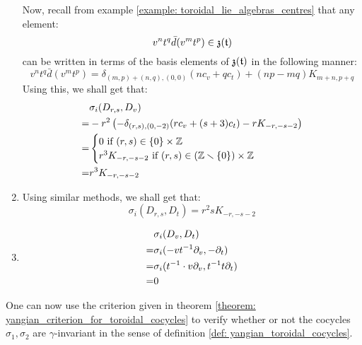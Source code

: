 \begin{example}
\begin{enumerate}
$$                    $$
                Now, recall from example \ref{example: toroidal_lie_algebras_centres} that any element:
                    $$v^n t^q \bar{d}(v^m t^p) \in \mathfrak{z}(\mathfrak{t})$$
                can be written in terms of the basis elements of $\mathfrak{z}(\mathfrak{t})$ in the following manner:
                    $$v^n t^q \bar{d}(v^m t^p) = \delta_{(m, p) + (n, q), (0, 0)} ( n c_v + q c_t ) + (np - mq) K_{m + n, p + q}$$
                Using this, we shall get that:
                    $$
                        \begin{aligned}
                            & \sigma_i(D_{r, s}, D_v)
                            \\
                            = & -r^2 \left( -\delta_{(r, s), (0, -2)} ( r c_v + (s + 3) c_t ) - r K_{-r, -s - 2} \right)
                            \\
                            = &
                            \begin{cases}
                                \text{$0$ if $(r, s) \in \{0\} \x \Z$}
                                \\
                                \text{$r^3 K_{-r, -s - 2}$ if $(r, s) \in (\Z \setminus \{0\}) \x \Z$}
                            \end{cases}
                            \\
                            = & r^3 K_{-r, -s - 2}
                        \end{aligned}
                    $$
                \item Using similar methods, we shall get that:
                    $$\sigma_i(D_{r, s}, D_t) = r^2s K_{-r, -s - 2}$$
                \item
                    $$
                        \begin{aligned}
                            & \sigma_i(D_v, D_t)
                            \\
                            = & \sigma_i(-v t^{-1} \partial_v, -\partial_t)
                            \\
                            = & \sigma_i(t^{-1} \cdot v \partial_v, t^{-1} t \partial_t)
                            \\
                            = & 0
                        \end{aligned}
                    $$
            \end{enumerate}
            One can now use the criterion given in theorem \ref{theorem: yangian_criterion_for_toroidal_cocycles} to verify whether or not the cocycles $\sigma_1, \sigma_2$ are $\gamma$-invariant in the sense of definition \ref{def: yangian_toroidal_cocycles}.
        \end{example}
